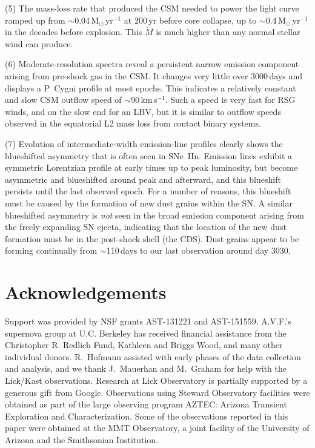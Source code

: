 \documentclass[fleqn,usenatbib,useAMS]{mnras}
\begin{document}
(5) The mass-loss rate that produced the CSM needed to power the light curve ramped up from $\sim$0.04\,M$_{\odot}$\,yr$^{-1}$ at 200\,yr before core collapse, up to $\sim$0.4\,M$_{\odot}$\,yr$^{-1}$ in the decades before explosion.  This $\dot{M}$ is much higher than any normal stellar wind can produce.  

(6) Moderate-resolution spectra reveal a persistent narrow emission component arising from pre-shock gas in the CSM.  It changes very little over 3000\,days and displays a P~Cygni profile at most epochs.  This indicates a relatively constant and slow CSM outflow speed of $\sim$90\,km\,s$^{-1}$. Such a speed is very fast for RSG winds, and on the slow end for an LBV, but it is similar to outflow speeds observed in the equatorial L2 mass loss from contact binary systems.

(7) Evolution of intermediate-width emission-line profiles clearly shows the blueshifted asymmetry that is often seen in SNe~IIn.  Emission lines exhibit a symmetric Lorentzian profile at early times up to peak luminosity, but become asymmetric and blueshifted around peak and afterward, and this blueshift persists until the last observed epoch.  For a number of reasons, this blueshift must be caused by the formation of new dust grains within the SN.  A similar blueshifted asymmetry is {\it not} seen in the broad emission component arising from the freely expanding SN ejecta, indicating that the location of the new dust formation must be in the post-shock shell (the CDS).  Dust grains appear to be forming continually from $\sim$110\,days to our last observation around day 3030.


\section*{Acknowledgements}
Support was provided by NSF grants AST-131221 and AST-151559. 
A.V.F.'s supernova group at U.C. Berkeley has received financial assistance from the Christopher R. Redlich Fund, Kathleen and Briggs Wood, and many other individual donors.
R.\ Hofmann assisted with early phases of the data collection and analysis, and we thank J.\ Mauerhan and M.\ Graham for help with the Lick/Kast observations.
Research at Lick Observatory is partially supported by a generous gift from Google.
 Observations using Steward
Observatory facilities were obtained as part of the large observing
program AZTEC: Arizona Transient Exploration and Characterization.
Some of the observations reported in this paper were
obtained at the MMT Observatory, a joint facility of the University
of Arizona and the Smithsonian Institution.
\end{document}
